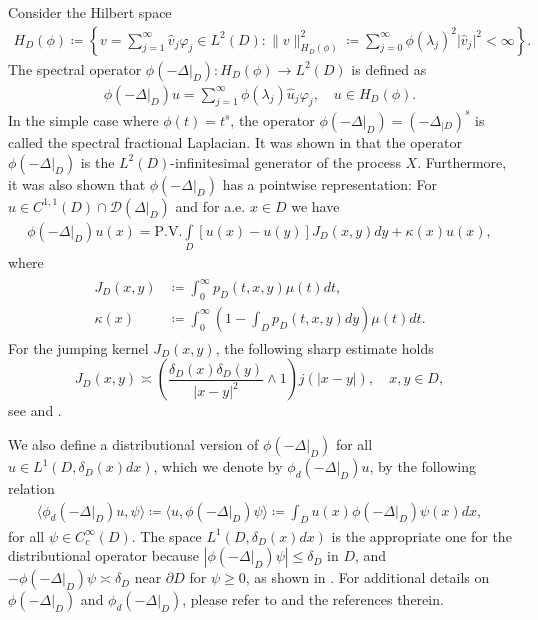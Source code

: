 \documentclass[12pt,a4paper,onecolumn]{amsart}
\theoremstyle{definition}
\newcommand{\1}{\mathbf 1}
\newcommand{\LLL}{L^1(D,\de(x)dx)}
\newcommand{\DD}{\mathcal{D}}
\newcommand{\Lo}{\phi(-\left.\Delta\right\vert_{D})}
\newcommand{\wLo}{\phi_d(-\left.\Delta\right\vert_{D})}
\newcommand{\de}{\delta_D}
\numberwithin{equation}{section}
\begin{document}
Consider the Hilbert space
	\begin{align*}
		H_D(\phi)\coloneqq \left\{v=\sum_{j=1}^\infty \widehat v_j\varphi_j\in L^2(D):\|v\|_{H_D(\phi)}^2\coloneqq\sum_{j=0}^\infty\phi(\lambda_j)^{2}\vert\widehat v_j\vert^2<\infty\right\}.
	\end{align*}
	The spectral operator $\Lo:H_D(\phi)\to L^2(D)$ is defined as
	\begin{align}\label{eq:definition of phi(Delta D)}
		\Lo u=\sum_{j=1}^\infty\phi(\lambda_j)\widehat u_j\varphi_j, \quad u\in H_D(\phi).
	\end{align}
 In the simple case where $\phi(t)=t^s$, the operator $\Lo=(-\Delta_{|D})^s$ is called the spectral fractional Laplacian.
 It was shown in \cite[Section 2]{Bio23} that the operator $\Lo$ is the $L^2(D)$-infinitesimal generator of the process $X$. Furthermore, it was also shown that $\Lo$ has a pointwise representation: For $u\in C^{1,1}(D)\cap \DD(\left.\Delta\right|_D)$ and for a.e. $x\in D$ we have
		\begin{align}\label{eq:Lo pointwisely}
			\Lo u(x)=\textrm{P.V.}\int\limits_D [u(x)-u(y)]J_D(x,y)dy + \kappa(x)u(x),
		\end{align}
		where
		\begin{align}\begin{split}\label{e:J_D}
		    J_D(x,y)&\coloneqq \int_0^\infty p_D(t,x,y)\mu(t)dt,\\\kappa(x)&\coloneqq\int_0^\infty \left(1-\int_Dp_D(t,x,y)dy\right)\mu(t)dt.
		\end{split}
		\end{align}
For the jumping kernel $J_D(x,y)$, the following sharp estimate holds
\begin{equation}\label{eq:J_D estimate}
    J_D(x,y)\asymp\left(\frac{\de(x)\de(y)}{|x-y|^2}\wedge 1\right)j(|x-y|),\quad x,y\in D,
\end{equation}
see \cite[Proposition 3.5]{ksv_minimal2016} and \cite[Remark 2.5]{Bio23}.

We also define a distributional version of $\Lo$ for all $u\in \LLL$, which we denote by $\wLo u$, by the following relation
\begin{align*}
    \langle \wLo u,\psi\rangle\coloneqq \langle  u,\Lo\psi\rangle\coloneqq\int_D u(x)\Lo \psi (x)dx,
\end{align*}
for all $\psi\in C_c^\infty(D)$. The space $\LLL$ is the appropriate one for the distributional operator because $|\Lo\psi|\le \de$ in $D$, and $-\Lo\psi\asymp \de$ near $\partial D$ for $\psi\ge0$, as shown in \cite[Lemma 2.11]{Bio23}. For additional details on $\Lo$ and $\wLo$, please refer to \cite[Section 2]{Bio23} and the references therein.
\end{document}
